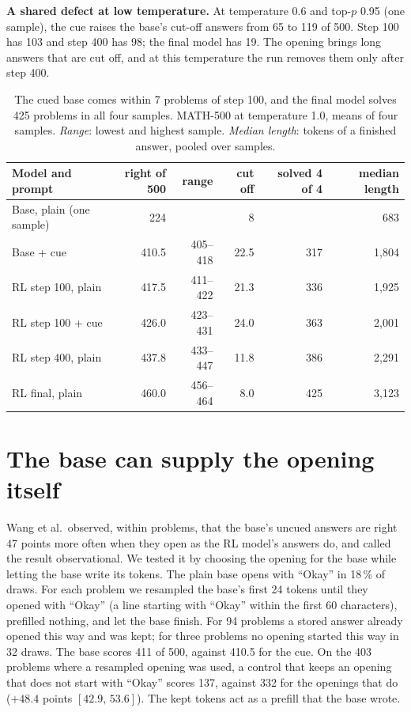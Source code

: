 \documentclass[10pt]{article}
\newcommand{\ci}[2]{$[#1,\,#2]$}
\begin{document}
\textbf{A shared defect at low temperature.} At temperature 0.6 and top-$p$ 0.95 (one sample), the cue raises the
base's cut-off answers from 65 to 119 of 500. Step 100 has 103 and step 400 has 98; the final model has 19. The
opening brings long answers that are cut off, and at this temperature the run removes them only after step 400.

\begin{table}[h]
\centering\small
\setlength{\tabcolsep}{5pt}
\begin{tabular}{@{}lrrrrr@{}}
\toprule
Model and prompt & right of 500 & range & cut off & solved 4 of 4 & median length \\
\midrule
Base, plain (one sample) & 224 & & 8 & & 683 \\
Base + cue & 410.5 & 405--418 & 22.5 & 317 & 1{,}804 \\
RL step 100, plain & 417.5 & 411--422 & 21.3 & 336 & 1{,}925 \\
RL step 100 + cue & 426.0 & 423--431 & 24.0 & 363 & 2{,}001 \\
RL step 400, plain & 437.8 & 433--447 & 11.8 & 386 & 2{,}291 \\
RL final, plain & 460.0 & 456--464 & 8.0 & 425 & 3{,}123 \\
\bottomrule
\end{tabular}
\caption{The cued base comes within 7 problems of step 100, and the final model solves 425 problems in all four
samples. MATH-500 at temperature 1.0, means of four samples. \emph{Range}: lowest and highest sample.
\emph{Median length}: tokens of a finished answer, pooled over samples.}
\label{tab:cells}
\end{table}

\section{The base can supply the opening itself}\label{sec:self}

Wang et al.\ observed, within problems, that the base's uncued answers are right 47 points more often when they
open as the RL model's answers do, and called the result observational. We tested it by choosing the opening
for the base while letting the base write its tokens. The plain base opens with ``Okay'' in 18\,\% of draws. For
each problem we resampled the base's first 24 tokens until they opened with ``Okay'' (a line starting with ``Okay'' within the first 60 characters), prefilled nothing, and let the
base finish. For 94 problems a stored answer already opened this way and was kept; for three problems no opening
started this way in 32 draws. The base scores 411 of 500, against 410.5 for the cue. On the 403 problems where a
resampled opening was used, a control that keeps an opening that does not start with ``Okay'' scores 137, against 332 for the
openings that do ($+48.4$ points \ci{42.9}{53.6}). The kept tokens act as a prefill that the base wrote.
\end{document}
